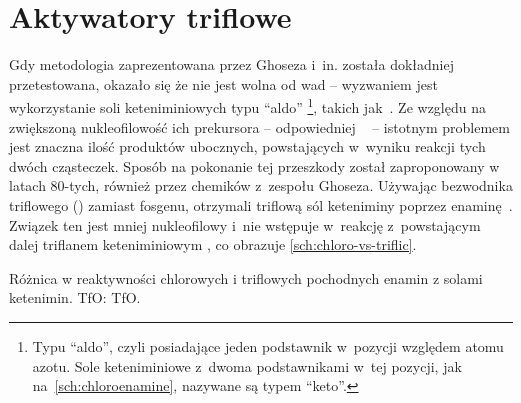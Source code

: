 \section{Aktywatory triflowe}\label{literature:triflic}
Gdy metodologia zaprezentowana przez Ghoseza i~in. została dokładniej przetestowana, okazało się że nie jest wolna od wad \---
  wyzwaniem jest wykorzystanie soli keteniminiowych typu \enquote{aldo}%
  \footnote{%
    Typu \enquote{aldo}, czyli posiadające jeden podstawnik w~pozycji \textbeta{} względem atomu azotu.
    Sole keteniminiowe z~dwoma podstawnikami w~tej pozycji, jak na~\cref{sch:chloroenamine}, nazywane są typem \enquote{keto}.%
  }, takich jak~.
Ze względu na zwiększoną nukleofilowość ich prekursora \--- odpowiedniej ~ \---
  istotnym problemem jest znaczna ilość produktów ubocznych, powstających w~wyniku reakcji tych dwóch cząsteczek.
Sposób na pokonanie tej przeszkody został zaproponowany w latach 80-tych, również przez chemików z~zespołu Ghoseza.
Używając bezwodnika triflowego () zamiast fosgenu,
  otrzymali triflową sól keteniminy poprzez enaminę~.
Związek ten jest mniej nukleofilowy i~nie wstępuje w~reakcję z~powstającym dalej triflanem keteniminiowym ,
  co obrazuje \cref{sch:chloro-vs-triflic}.
\begin{scheme*}
  \centering
  
  \caption{Różnica w reaktywności chlorowych i triflowych pochodnych enamin z solami ketenimin. \acrshort{TfO}: \acrlong{TfO}.}
  \label{sch:chloro-vs-triflic}
\end{scheme*}

